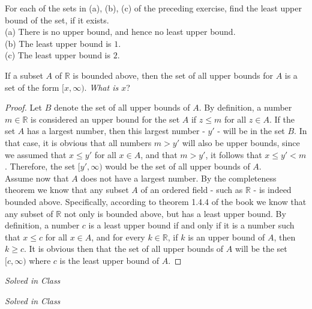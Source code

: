 \documentclass[12pt]{book}
\newenvironment{theorem}[2][Theorem]{\begin{trivlist}
\item[\hskip \labelsep {\bfseries #1}\hskip \labelsep {\bfseries #2.}]}{\end{trivlist}}
\newenvironment{exercise}[2][Exercise]{\begin{trivlist}
\item[\hskip \labelsep {\bfseries #1}\hskip \labelsep {\bfseries #2.}]}{\end{trivlist}}
\begin{document}
\begin{exercise}{1.4.2}
For each of the sets in (a), (b), (c) of the preceding exercise, find the least upper bound of the set, if it exists.\\

(a) There is no upper bound, and hence no least upper bound. \\
(b) The least upper bound is $1$.\\
(c) The least upper bound is $2$.
\end{exercise}



\begin{theorem}{1.4.3}
If a subset $A$ of $\mathbb{R}$ is bounded above, then the set of all upper bounds for $A$ is a set of the form $[x, \infty)$. \emph{What is $x$}?
\end{theorem}

\begin{proof}
Let $B$ denote the set of all upper bounds of $A$. By definition, a number $m \in \mathbb{R}$ is considered an upper bound for the set $A$ if $z \leq m$ for all $z \in A$. If the set $A$ has a largest number, then this largest number - $y'$ - will be in the set $B$. In that case, it is obvious that all numbers $m > y'$ will also be upper bounds, since we assumed that $x \leq y'$ for all $x \in A$, and that $m > y'$, it follows that $x \leq y' < m$. Therefore, the set $[y', \infty)$ would be the set of all upper bounds of $A$. \\
Assume now that $A$ does not have a largest number. By the completeness theorem we know that any subset $A$ of an ordered field - such as $\mathbb{R}$ - is indeed bounded above. Specifically, according to theorem 1.4.4 of the book we know that any subset of $\mathbb{R}$ not only is bounded above, but has a least upper bound. By definition, a number $c$ is a least upper bound if and only if it is a number such that $x \leq c$ for all $x \in A$, and for every $k \in \mathbb{R}$, if $k$ is an upper bound of $A$, then $k \geq c$. It is obvious then that the set of all upper bounds of $A$ will be the set $[c, \infty)$ where $c$ is the least upper bound of $A$.
\end{proof}


\begin{exercise}{1.4.4}
\emph{Solved in Class}
\end{exercise}

\begin{exercise}{1.4.7}
\emph{Solved in Class}
\end{exercise}
\end{document}
